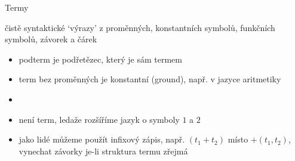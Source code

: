\documentclass{beamer}
\begin{document}
\begin{frame}{Termy}

    \vspace{-6pt}
    \alert{čistě syntaktické} `výrazy' z proměnných, konstantních symbolů, funkčních symbolů, závorek a čárek \pause 
    

    \begin{itemize}
        \item \alert{podterm} je podřetězec, který je sám termem \pause 
        \item term bez proměnných je \alert{konstantní (ground)}, např.  v jazyce aritmetiky \pause 
        \item {} \pause 
        \item {} \alert{není} term, ledaže rozšíříme jazyk o \alert{symboly} $1$ a $2$ \pause 
        \item jako lidé můžeme použít \alert{infixový} zápis, např. $(t_1+t_2)$ místo $+(t_1,t_2)$, vynechat závorky je-li struktura termu zřejmá
    \end{itemize}

\end{frame}
\end{document}
